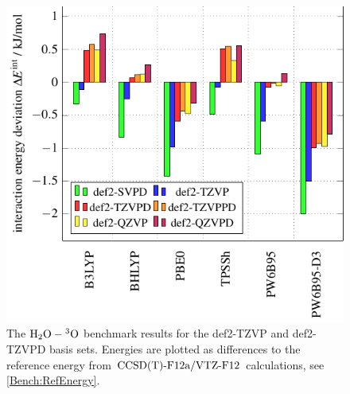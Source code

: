 \begin{figure}[b!]
\centering
% 
\includegraphics[width=.7\textwidth]{TikzPics/TikzCreation/Bench/BenchH2O+O.FuncCompare.pdf}
\caption{The $\mbox{\ensuremath{\text H _2 \text O-\hspace{.2pt} ^3\text{O}}}$ benchmark results for the def2-TZVP and def2-TZVPD basis sets.
Energies are plotted as differences
to the reference energy from $\text{CCSD(T)-F12a}/\text{VTZ-F}12$ calculations, see \eqref{Bench:RefEnergy}.}
\label{Fig:Bench:H2O+O:FuncCompare}
\end{figure}


